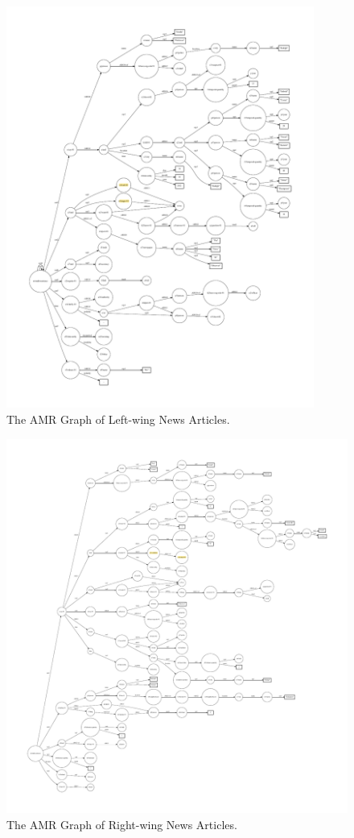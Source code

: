 \begin{figure}[ht]
    \centering
    \includegraphics[width=0.9\textwidth]{img/empirical-amr-left}
    \caption{The AMR Graph of Left-wing News Articles.}
    \label{fig:empirical-amr-left}
\end{figure}
\begin{figure}[ht]
    \centering
    \includegraphics[width=\textwidth]{img/empirical-amr-right}
    \caption{The AMR Graph of Right-wing News Articles.}
    \label{fig:empirical-amr-right}
\end{figure}
\clearpage

